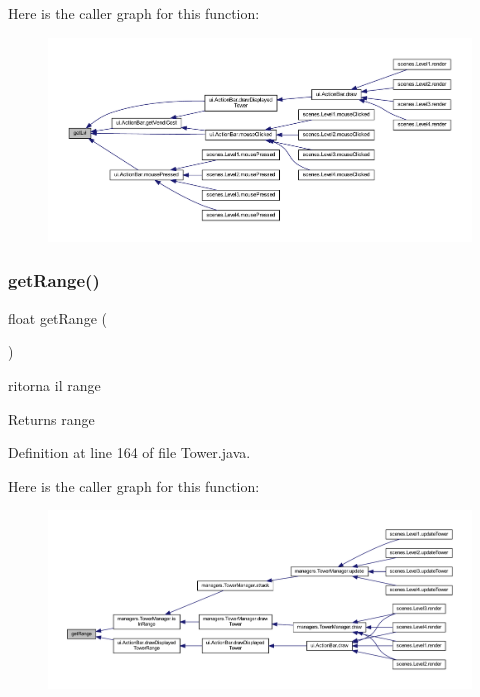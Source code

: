 Here is the caller graph for this function\+:\nopagebreak
\begin{figure}[H]
\begin{center}
\leavevmode
\includegraphics[width=350pt]{classtowers_1_1_tower_a69ffaa5d69141ba9aed07daf94b18540_icgraph}
\end{center}
\end{figure}
\mbox{\label{classtowers_1_1_tower_a18d1640fde65c20187e68286b6bbcf6d}} 
\subsubsection{\texorpdfstring{get\+Range()}{getRange()}}
{\footnotesize\ttfamily float get\+Range (\begin{DoxyParamCaption}{ }\end{DoxyParamCaption})}



ritorna il range 

\begin{DoxyReturn}{Returns}
range 
\end{DoxyReturn}


Definition at line 164 of file Tower.\+java.

Here is the caller graph for this function\+:
\nopagebreak
\begin{figure}[H]
\begin{center}
\leavevmode
\includegraphics[width=350pt]{classtowers_1_1_tower_a18d1640fde65c20187e68286b6bbcf6d_icgraph}
\end{center}
\end{figure}
\mbox{\label{classtowers_1_1_tower_adaa3345598ef202753372f185625e5da}} 
